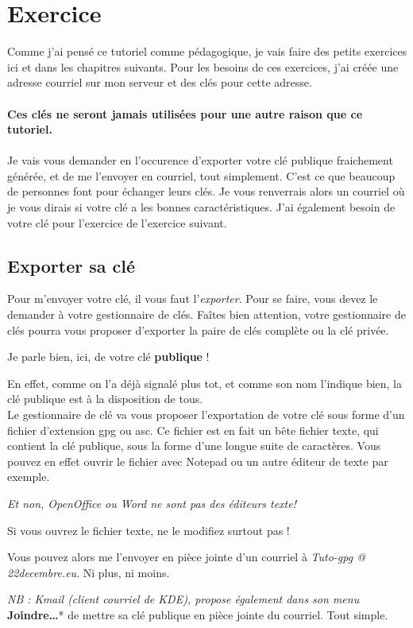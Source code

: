\section{Exercice}\label{exercice}

Comme j'ai pensé ce tutoriel comme pédagogique, je vais faire des petits
exercices ici et dans les chapitres suivants. Pour les besoins de ces
exercices, j'ai créée une adresse courriel sur mon serveur et des clés
pour cette adresse.\\
\\
\textbf{Ces clés ne seront jamais utilisées pour une autre raison que ce tutoriel.}\\
\\
Je vais vous demander en l'occurence d'exporter votre clé publique
fraichement générée, et de me l'envoyer en courriel, tout simplement.
C'est ce que beaucoup de personnes font pour échanger leurs clés. Je vous renverrais alors un courriel où je vous dirais si votre clé a
les bonnes caractéristiques. J'ai également besoin de votre clé pour
l'exercice de l'exercice suivant.

\subsection{Exporter sa clé}\label{exporter-sa-cluxe9}

Pour m'envoyer votre clé, il vous faut l'\emph{exporter}. Pour se faire, vous devez le demander à votre gestionnaire de clés. Faîtes bien attention, votre gestionnaire de clés pourra vous proposer
d'exporter la paire de clés complète ou la clé privée.

Je parle bien, ici, de votre clé \textbf{publique} !

En effet, comme on l'a déjà signalé plus tot, et comme son nom l'indique
bien, la clé publique est à la disposition de tous.\\Le gestionnaire de
clé va vous proposer l'exportation de votre clé sous forme d'un fichier
d'extension gpg ou asc. Ce fichier est en fait un bête fichier texte, qui contient la clé
publique, sous la forme d'une longue suite de caractères. Vous pouvez en
effet ouvrir le fichier avec Notepad ou un autre éditeur de texte par
exemple.

\emph{Et non, OpenOffice ou Word ne sont pas des éditeurs texte!}

\begin{warning}
	Si vous ouvrez le fichier texte, ne le modifiez surtout pas !
\end{warning}


Vous pouvez alors me l'envoyer en pièce jointe d'un courriel à
\emph{Tuto-gpg @ 22decembre.eu}. Ni plus, ni moins.

\emph{NB : Kmail (client courriel de KDE), propose également dans son menu }\textbf{Joindre\ldots{}}* de mettre sa clé publique en pièce
jointe du courriel. Tout simple.